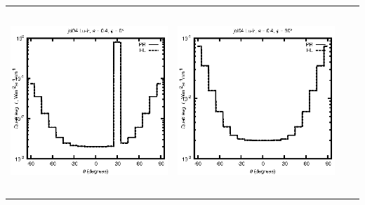\begin{tabular}{c c c c}
\includegraphics[height=7cm]{../eps/jol04_Lu_ir_fwd.eps} &
\includegraphics[height=7cm]{../eps/jol04_Lu_ir_cross.eps} \\
\end{tabular}

\pagebreak

